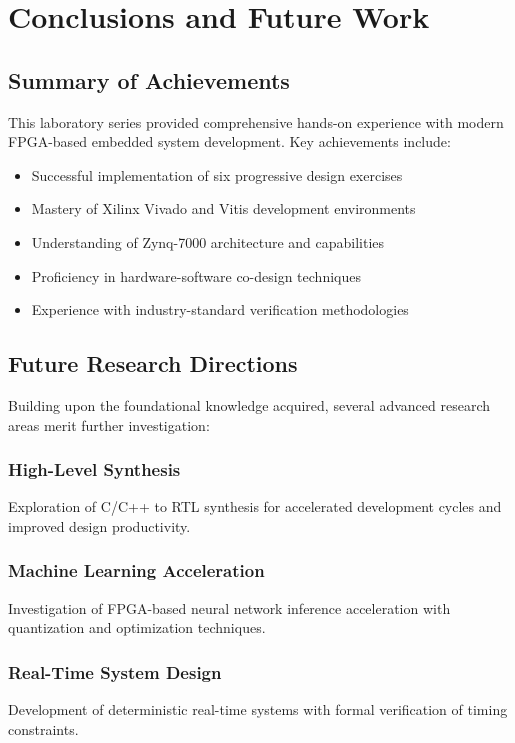 \documentclass[11pt,a4paper]{article}
\begin{document}
\section{Conclusions and Future Work}

\subsection{Summary of Achievements}

This laboratory series provided comprehensive hands-on experience with modern FPGA-based embedded system development. Key achievements include:

\begin{itemize}[leftmargin=*]
    \item Successful implementation of six progressive design exercises
    \item Mastery of Xilinx Vivado and Vitis development environments
    \item Understanding of Zynq-7000 architecture and capabilities
    \item Proficiency in hardware-software co-design techniques
    \item Experience with industry-standard verification methodologies
\end{itemize}

\subsection{Future Research Directions}

Building upon the foundational knowledge acquired, several advanced research areas merit further investigation:

\subsubsection{High-Level Synthesis}
Exploration of C/C++ to RTL synthesis for accelerated development cycles and improved design productivity.

\subsubsection{Machine Learning Acceleration}
Investigation of FPGA-based neural network inference acceleration with quantization and optimization techniques.

\subsubsection{Real-Time System Design}
Development of deterministic real-time systems with formal verification of timing constraints.
\end{document}
